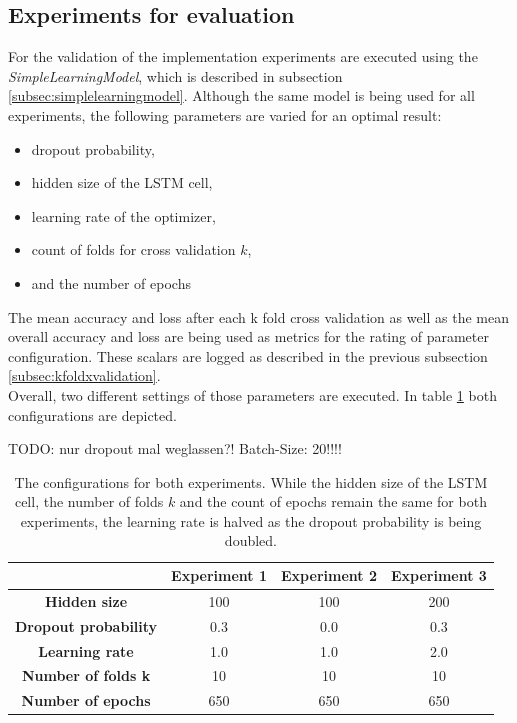 \subsection{Experiments for evaluation}
\label{subsec:experiments}
For the validation of the implementation experiments are executed using the \textit{SimpleLearningModel}, which is described in subsection \ref{subsec:simplelearningmodel}. Although the same model is being used for all experiments, the following parameters are varied for an optimal result:
\begin{itemize}
	\item dropout probability, 
	\item hidden size of the LSTM cell, 
	\item learning rate of the optimizer, 
	\item count of folds for cross validation $k$, 
	\item and the number of epochs
\end{itemize}
The mean accuracy and loss after each k fold cross validation as well as the mean overall accuracy and loss are being used as metrics for the rating of parameter configuration. These scalars are logged as described in the previous subsection \ref{subsec:kfoldxvalidation}. 
\\
Overall, two different settings of those parameters are executed. In table \ref{tbl:experiments} both configurations are depicted. 

TODO: nur dropout mal weglassen?!
Batch-Size: 20!!!!

\renewcommand{\arraystretch}{1.5}
\begin{table}[!ht]
	\begin{center}
		\begin{tabular}{c|c|c|c}
			 & \textbf{Experiment 1} & \textbf{Experiment 2} & \textbf{Experiment 3} \\
			\hline
			\textbf{Hidden size} & 100 &  100 & 200 \\
			\hline
			\textbf{Dropout probability} & 0.3 & 0.0 & 0.3\\
			\hline
			\textbf{Learning rate} & 1.0 & 1.0 & 2.0\\
			\hline
			\textbf{Number of folds k} & 10 & 10 & 10 \\
			\hline
			\textbf{Number of epochs} & 650 & 650 & 650 \\
		\end{tabular}
	\end{center}
	\caption{The configurations for both experiments. While the hidden size of the LSTM cell, the number of folds $k$ and the count of epochs remain the same for both experiments, the learning rate is halved as the dropout probability is being doubled. }
	\label{tbl:experiments}
\end{table}

